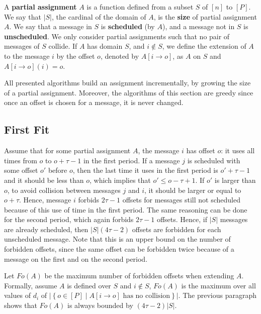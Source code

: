 \documentclass[a4paper,UKenglish,cleveref, autoref, thm-restate]{lipics-v2019}
\begin{document}
A \textbf{partial assignment} $A$ is a function defined from a subset $S$ of $[n]$ to $[P]$.
We say that $|S|$, the cardinal of the domain of $A$, is the \textbf{size} of partial assignment $A$.
We say that a message in $S$ is \textbf{scheduled} (by $A$), and a message not in $S$ is \textbf{unscheduled}. We only consider partial assignments such that no pair of messages of $S$ collide. If $A$ has domain $S$, and $i \notin S$, we define the extension of $A$ to the message $i$ by the offset $o$, denoted by $A[i \rightarrow o]$, as $A$ on $S$ and $A[i \rightarrow o](i) = o$.

All presented algorithms build an assignment incrementally, by growing the size of a partial assignment. Moreover, the algorithms of this section are greedy since once an offset is chosen for a message, it is never changed.


\subsection{First Fit}


Assume that for some partial assignment $A$, the message $i$ has offset $o$: it uses all times from $o$ to $o + \tau -1$ in the first period. If a message $j$ is scheduled with some offset $o'$ before $o$, then the last time it uses in the first period is $o'+\tau-1$ and it should be less than $o$, which implies that $o' \leq o - \tau + 1$. If $o'$ is larger than $o$, to avoid collision between messages $j$ and $i$, it should be larger or equal to $o+ \tau$. Hence, message $i$ forbids $2\tau -1$ offsets for messages still not scheduled because of this use of time in the first period. The same reasoning can be done for the second period, which again forbids $2\tau -1$ offsets. Hence, if $|S|$ messages are already scheduled, then $|S|(4\tau -2)$ offsets are forbidden for each unscheduled message. Note that this is an upper bound on the number of forbidden offsets, since the same offset can be forbidden twice because of a message on the first and on the second period.


Let $Fo(A)$ be the maximum number of forbidden offsets when extending $A$. Formally, assume $A$ is defined over $S$ and $i\notin S$, $Fo(A)$ is the maximum over all values of $d_i$ of $|\left\{ o \in [P] \mid A[i \rightarrow o] \text{ has no collision}\right\}|$. The previous paragraph shows that $Fo(A)$ is always bounded by $(4 \tau -2)|S|$. 
\end{document}
